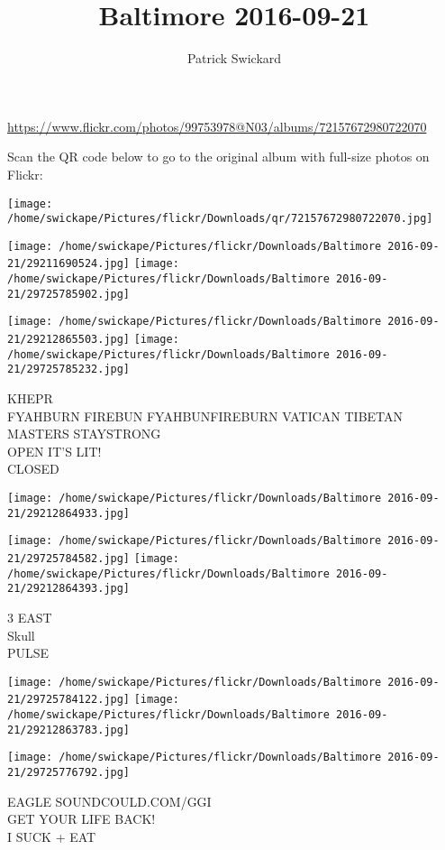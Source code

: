 \documentclass[10pt,letterpaper]{article}
\title{Baltimore 2016-09-21}
\author{Patrick Swickard}
\date{}
\begin{document}
\maketitle

\url{https://www.flickr.com/photos/99753978@N03/albums/72157672980722070}

Scan the QR code below to go to the original album with full-size photos on Flickr:

\texttt{[image: /home/swickape/Pictures/flickr/Downloads/qr/72157672980722070.jpg]}
\pagebreak

\texttt{[image: /home/swickape/Pictures/flickr/Downloads/Baltimore 2016-09-21/29211690524.jpg]}
\texttt{[image: /home/swickape/Pictures/flickr/Downloads/Baltimore 2016-09-21/29725785902.jpg]}

\texttt{[image: /home/swickape/Pictures/flickr/Downloads/Baltimore 2016-09-21/29212865503.jpg]}
\texttt{[image: /home/swickape/Pictures/flickr/Downloads/Baltimore 2016-09-21/29725785232.jpg]}

KHEPR\\
FYAHBURN FIREBUN FYAHBUNFIREBURN VATICAN TIBETAN MASTERS STAYSTRONG\\
OPEN IT'S LIT!\\
CLOSED
\pagebreak

\texttt{[image: /home/swickape/Pictures/flickr/Downloads/Baltimore 2016-09-21/29212864933.jpg]}

\vspace{0.25in}
\texttt{[image: /home/swickape/Pictures/flickr/Downloads/Baltimore 2016-09-21/29725784582.jpg]}
\texttt{[image: /home/swickape/Pictures/flickr/Downloads/Baltimore 2016-09-21/29212864393.jpg]}

3 EAST\\
Skull\\
PULSE
\pagebreak

\texttt{[image: /home/swickape/Pictures/flickr/Downloads/Baltimore 2016-09-21/29725784122.jpg]}
\texttt{[image: /home/swickape/Pictures/flickr/Downloads/Baltimore 2016-09-21/29212863783.jpg]}

\vspace{0.25in}
\texttt{[image: /home/swickape/Pictures/flickr/Downloads/Baltimore 2016-09-21/29725776792.jpg]}

EAGLE SOUNDCOULD.COM/GGI\\
GET YOUR LIFE BACK!\\
I SUCK + EAT
\pagebreak
\end{document}

